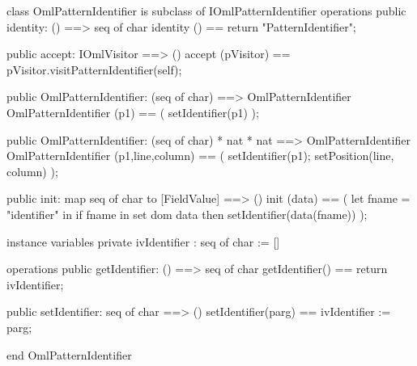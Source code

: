 \begin{vdm_al}
class OmlPatternIdentifier is subclass of IOmlPatternIdentifier
operations
  public identity: () ==> seq of char
  identity () == return "PatternIdentifier";

  public accept: IOmlVisitor ==> ()
  accept (pVisitor) == pVisitor.visitPatternIdentifier(self);

  public OmlPatternIdentifier:
    (seq of char) ==> OmlPatternIdentifier
  OmlPatternIdentifier (p1) == 
    ( setIdentifier(p1) );

  public OmlPatternIdentifier:
    (seq of char) *
    nat *
    nat ==> OmlPatternIdentifier
  OmlPatternIdentifier (p1,line,column) == 
    ( setIdentifier(p1);
      setPosition(line, column) );

  public init: map seq of char to [FieldValue] ==> ()
  init (data) ==
    ( let fname = "identifier" in
        if fname in set dom data
        then setIdentifier(data(fname)) );

instance variables
  private ivIdentifier : seq of char := []

operations
  public getIdentifier: () ==> seq of char
  getIdentifier() == return ivIdentifier;

  public setIdentifier: seq of char ==> ()
  setIdentifier(parg) == ivIdentifier := parg;

end OmlPatternIdentifier
\end{vdm_al}

